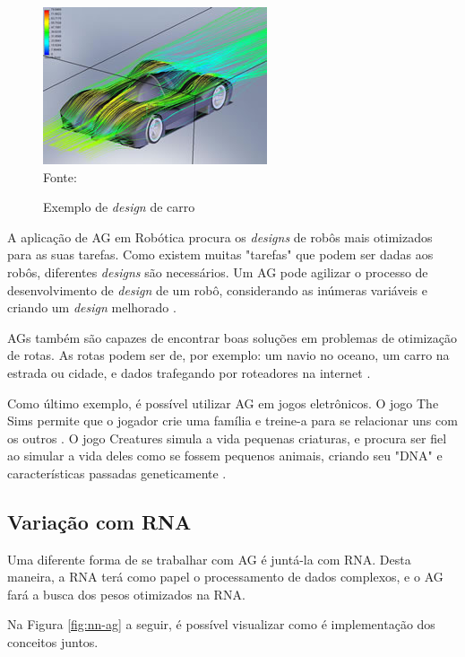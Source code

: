 \documentclass[
	12pt,					%
	openright,				%
	oneside,				%
	a4paper,				%
	bibjustif,				%
	chapter=TITLE,			%
	english,				%
	brazil,					%
	]{abntex2}
\newcommand{\source}[1]{\small Fonte: {#1}}
\begin{document}
	\begin{figure}[ht!]
		\centering
		\caption{Exemplo de \textit{design} de carro}
		\includegraphics[scale=0.7]{img/AutomotiveDesign.jpg}\\
		\vspace{0.5mm}
		\source{}
		\label{fig:automotiveDesign}
	\end{figure}
	
	A aplicação de AG em Robótica procura os \textit{designs} de robôs mais otimizados para as suas tarefas.
	Como existem muitas "tarefas"{} que podem ser dadas aos robôs,
	diferentes \textit{designs} são necessários.
	Um AG pode agilizar o processo de desenvolvimento de \textit{design} de um robô,
	considerando as inúmeras variáveis e criando um \textit{design} melhorado
	\cite{brainz}.
	
	AGs também são capazes de encontrar boas soluções em problemas de otimização de rotas.
	As rotas podem ser de, por exemplo:
	um navio no oceano,
	um carro na estrada ou cidade,
	e dados trafegando por roteadores na internet
	\cite{brainz}.
	
	Como último exemplo,
	é possível utilizar AG em jogos eletrônicos.
	O jogo The Sims permite que o jogador crie uma família e treine-a para se relacionar uns com os outros
	\cite{brainz}.
	O jogo Creatures simula a vida pequenas criaturas,
	e procura ser fiel ao simular a vida deles como se fossem pequenos animais,
	criando seu "DNA"{} e características passadas geneticamente
	\cite{aigamedev}.
	
	\FloatBarrier
	\subsection{Variação com RNA}
	Uma diferente forma de se trabalhar com AG é juntá-la com RNA.
	Desta maneira, a RNA terá como papel o processamento de dados complexos,
	e o AG fará a busca dos pesos otimizados na RNA.
	
	Na Figura \ref{fig:nn-ag} a seguir, é possível visualizar como é implementação dos conceitos juntos.
	
\end{document}
